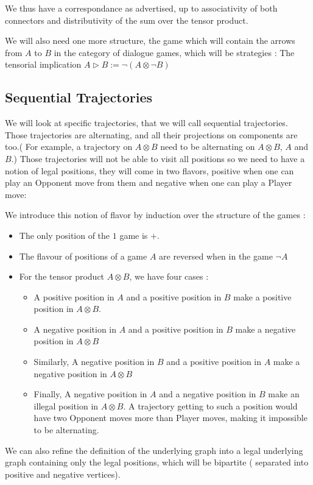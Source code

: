 \documentclass[a4paper,UKenglish]{lipics}
\begin{document}
We thus have a correspondance as advertised, up to associativity of both connectors and distributivity of the sum over the tensor product.

We will also need one more structure, the game which will contain the arrows from $A$ to $B$ in the category of dialogue games, which will be strategies : The tensorial implication $A \triangleright B := \neg (A \otimes \neg B)$

\subsection{Sequential Trajectories}

We will look at specific trajectories, that we will call sequential trajectories. Those trajectories are alternating, and all their projections on components are too.( For example, a trajectory on $A \otimes B$ need to be alternating on $A \otimes B$, $A$ and $B$.) Those trajectories will not be able to visit all positions so we need to have a notion of legal positions, they will come in two flavors, positive when one can play an Opponent  move from them and negative when one can play a Player move:
\begin{definition} We introduce this notion of flavor by induction over the structure of the games : 
\begin{itemize}
\item The only position of the $1$ game is $+$. 
\item The flavour of positions of a game $A$ are reversed when in the  game $\neg A$
\item  For the tensor product $ A\otimes B$, we have four cases :\\
\begin{itemize}
\item A positive position in $A$ and a positive position in $B$ make a positive position in $A \otimes B$.
\item A negative position in $A$ and a positive position in $B$ make a negative position in $A \otimes B$
\item Similarly, A negative position in $B$ and a positive position in $A$ make a negative position in $A \otimes B$
\item Finally, A negative position in $A$ and a negative position in $B$ make an illegal position in $A \otimes B$. A trajectory getting to such a position would have two Opponent moves more than Player moves, making it impossible to be alternating.\\
\end{itemize}
\end{itemize}
\end{definition}
We can also refine the definition of the underlying graph into a legal underlying graph containing only the legal positions, which will be bipartite ( separated into positive and negative vertices).
\end{document}
